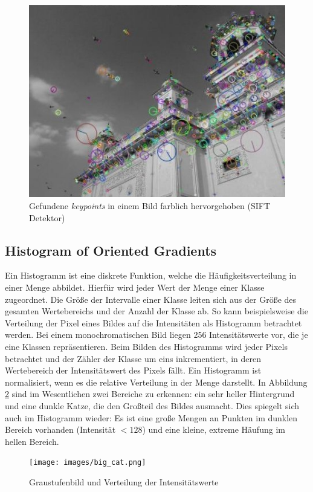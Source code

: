 \begin{figure}
	\centering
	\includegraphics[scale=0.7]{images/sift_keypoints.jpg}
	\caption{Gefundene \textit{keypoints} in einem Bild farblich hervorgehoben (SIFT Detektor)}
	\label{img:interset_points}
\end{figure}

\subsection{Histogram of Oriented Gradients}
\label{sec:hog}

Ein Histogramm ist eine diskrete Funktion, welche die Häufigkeitsverteilung in einer Menge abbildet. Hierfür wird jeder Wert der Menge einer Klasse zugeordnet. Die Größe der Intervalle einer Klasse leiten sich aus der Größe des gesamten Wertebereichs und der Anzahl der Klasse ab. So kann beispielsweise die Verteilung der Pixel eines Bildes auf die Intensitäten als Histogramm betrachtet werden. Bei einem monochromatischen Bild liegen 256 Intensitätswerte vor, die je eine Klassen repräsentieren. Beim Bilden des Histogramms wird jeder Pixels betrachtet und der Zähler der Klasse um eins inkrementiert, in deren Wertebereich der Intensitätswert des Pixels fällt. Ein Histogramm ist normalisiert, wenn es die relative Verteilung in der Menge darstellt.
In Abbildung \ref{img:hist} sind im Wesentlichen zwei Bereiche zu erkennen: ein sehr heller Hintergrund und eine dunkle Katze, die den Großteil des Bildes ausmacht. Dies spiegelt sich auch im Histogramm wieder: Es ist eine große Mengen an Punkten im dunklen Bereich vorhanden (Intensität $< 128$) und eine kleine, extreme Häufung im hellen Bereich.

\begin{figure}
	\centering
	\texttt{[image: images/big\_cat.png]}
	\caption{Graustufenbild und Verteilung der Intensitätswerte}
	\label{img:hist}
\end{figure}

